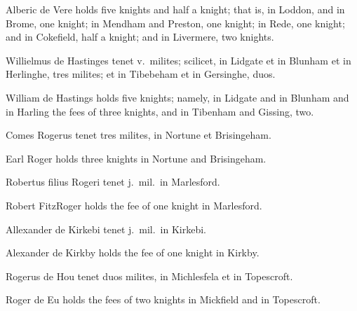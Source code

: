 \documentclass[10pt]{book}
\begin{document}
\begin{paracol}{2}
\switchcolumn

Alberic de Vere holds five knights and half a knight; that is, in Loddon, and in Brome, one knight; in Mendham and Preston, one knight; in Rede, one knight; and in Cokefield, half a knight; and in Livermere, two knights.

\switchcolumn*

\begin{otherlanguage}{latin}
Willielmus de Hastinges tenet v.\ milites; scilicet, in Lidgate et in Blunham et in Herlinghe, tres milites; et in Tibebeham et in Gersinghe, duos.
\end{otherlanguage}

\switchcolumn

William de Hastings holds five knights; namely, in Lidgate and in Blunham and in Harling the fees of three knights, and in Tibenham and Gissing, two.

\switchcolumn*

\begin{otherlanguage}{latin}
Comes Rogerus tenet tres milites, in Nortune et Brisingeham.
\end{otherlanguage}

\switchcolumn

Earl Roger holds three knights in Nortune and Brisingeham.

\switchcolumn*

\begin{otherlanguage}{latin}
Robertus filius Rogeri tenet j.\ mil.\ in Marlesford.
\end{otherlanguage}

\switchcolumn

Robert FitzRoger holds the fee of one knight in Marlesford.

\switchcolumn*

\begin{otherlanguage}{latin}
Allexander de Kirkebi tenet j.\ mil.\ in Kirkebi.
\end{otherlanguage}

\switchcolumn

Alexander de Kirkby holds the fee of one knight in Kirkby.

\switchcolumn*

\begin{otherlanguage}{latin}
Rogerus de Hou tenet duos milites, in Michlesfela et in Topescroft.
\end{otherlanguage}

\switchcolumn

Roger de Eu holds the fees of two knights in Mickfield and in Topescroft.


\end{paracol}
\end{document}
